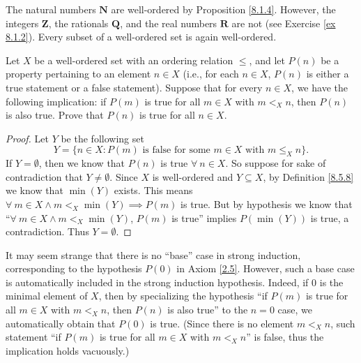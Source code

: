 \begin{example}\label{8.5.9}
    The natural numbers \(\mathbf{N}\) are well-ordered by Proposition \ref{8.1.4}.
    However, the integers \(\mathbf{Z}\), the rationals \(\mathbf{Q}\), and the real numbers \(\mathbf{R}\) are not (see Exercise \ref{ex 8.1.2}).
    Every subset of a well-ordered set is again well-ordered.
\end{example}

\begin{proposition}\label{8.5.10}
    Let \(X\) be a well-ordered set with an ordering relation \(\leq\), and let \(P(n)\) be a property pertaining to an element \(n \in X\)
    (i.e., for each \(n \in X\), \(P(n)\) is either a true statement or a false statement).
    Suppose that for every \(n \in X\), we have the following implication:
    if \(P(m)\) is true for all \(m \in X\) with \(m <_X n\), then \(P(n)\) is also true.
    Prove that \(P(n)\) is true for all \(n \in X\).
\end{proposition}

\begin{proof}
    Let \(Y\) be the following set
    \[
        Y = \{n \in X : P(m) \text{ is false for some } m \in X \text{ with } m \leq_X n\}.
    \]
    If \(Y = \emptyset\), then we know that \(P(n)\) is true \(\forall\ n \in X\).
    So suppose for sake of contradiction that \(Y \neq \emptyset\).
    Since \(X\) is well-ordered and \(Y \subseteq X\), by Definition \ref{8.5.8} we know that \(\min(Y)\) exists.
    This means \(\forall\ m \in X \land m <_X \min(Y) \implies P(m)\) is true.
    But by hypothesis we know that ``\(\forall\ m \in X \land m <_X \min(Y)\), \(P(m)\) is true'' implies \(P(\min(Y))\) is true, a contradiction.
    Thus \(Y = \emptyset\).
\end{proof}

\begin{remark}\label{8.5.11}
    It may seem strange that there is no ``base'' case in strong induction, corresponding to the hypothesis \(P(0)\) in Axiom \ref{2.5}.
    However, such a base case is automatically included in the strong induction hypothesis.
    Indeed, if \(0\) is the minimal element of \(X\), then by specializing the hypothesis ``if \(P(m)\) is true for all \(m \in X\) with \(m <_X n\), then \(P(n)\) is also true'' to the \(n = 0\) case, we automatically obtain that \(P(0)\) is true.
    (Since there is no element \(m <_X n\), such statement ``if \(P(m)\) is true for all \(m \in X\) with \(m <_X n\)'' is false, thus the implication holds vacuously.)
\end{remark}

